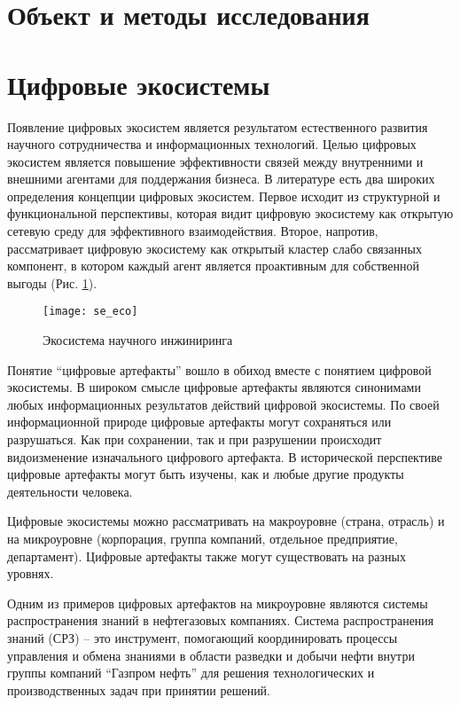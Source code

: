 \section[Объект и метод]{Объект и методы исследования}
\label{cha:objectandmethod}

\section{Цифровые экосистемы}
Появление цифровых экосистем является результатом естественного развития научного сотрудничества и информационных технологий. 
Целью цифровых экосистем является повышение эффективности связей между внутренними и внешними агентами для поддержания бизнеса. 
В литературе есть два широких определения концепции цифровых экосистем. 
Первое исходит из структурной и функциональной перспективы, которая видит цифровую экосистему как открытую сетевую среду для эффективного взаимодействия. Второе, напротив, рассматривает цифровую экосистему как открытый кластер слабо связанных компонент, в котором каждый агент является проактивным для собственной выгоды (Рис. \ref{fig:om0}).

\begin{figure}[H]
  \label{fig:om0}
  \centering
  \texttt{[image: se\_eco]}
  \caption{Экосистема научного инжиниринга}
\end{figure}

Понятие ``цифровые артефакты'' вошло в обиход вместе с понятием цифровой экосистемы. 
В широком смысле цифровые артефакты являются синонимами любых информационных результатов действий цифровой экосистемы. 
По своей информационной природе цифровые артефакты могут сохраняться или разрушаться.
Как при сохранении, так и при разрушении происходит видоизменение изначального цифрового артефакта. 
В исторической перспективе цифровые артефакты могут быть изучены, как и любые другие продукты деятельности человека.

Цифровые экосистемы можно рассматривать на макроуровне (страна, отрасль) и на микроуровне (корпорация, группа компаний, отдельное предприятие, департамент). Цифровые артефакты также могут существовать на разных уровнях. 

Одним из примеров цифровых артефактов на микроуровне являются системы распространения знаний в нефтегазовых компаниях.
Система распространения знаний (СРЗ) – это инструмент, помогающий координировать процессы управления и обмена знаниями в области разведки и добычи нефти внутри группы компаний ``Газпром нефть'' для решения технологических и производственных задач при принятии решений. 

